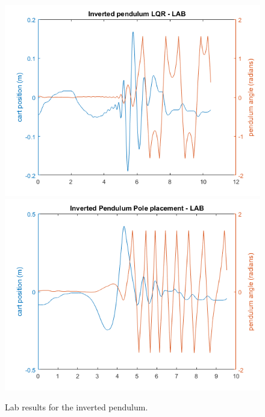 \documentclass[a4paper,12pt]{article}
\begin{document}
\begin{figure}[h]
\centering
\includegraphics[scale=0.4]{lqrip-lab.png}
\includegraphics[scale=0.4]{ppip-lab.png}
\caption{Lab results for the inverted pendulum.}
\end{figure}
\end{document}
